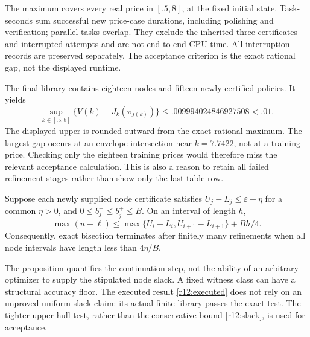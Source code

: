 \begin{table}[t]\centering\small
\caption{Constructive continuation to the uniform economic tolerance}\label{r12:frontier}

\par\smallskip\footnotesize The maximum covers every real price in $[.5,8]$, at the fixed initial state. Task-seconds sum successful new price-case durations, including polishing and verification; parallel tasks overlap. They exclude the inherited three certificates and interrupted attempts and are not end-to-end CPU time. All interruption records are preserved separately. The acceptance criterion is the exact rational gap, not the displayed runtime.
\end{table}

The final library contains eighteen nodes and fifteen newly certified policies. It yields
\begin{equation}
 \sup_{k\in[.5,8]}\{V(k)-J_k(\pi_{j(k)})\}
 \leq .009994024846927508 < .01.
 \label{r12:executed}
\end{equation}
The displayed upper is rounded outward from the exact rational maximum. The largest gap occurs at an envelope intersection near $k=7.7422$, not at a training price. Checking only the eighteen training prices would therefore miss the relevant acceptance calculation. This is also a reason to retain all failed refinement stages rather than show only the last table row.

\begin{proposition}\label{r12:termination}
Suppose each newly supplied node certificate satisfies $U_j-L_j\leq\varepsilon-\eta$ for a common $\eta>0$, and $0\leq b_j^-\leq b_j^+\leq\bar B$. On an interval of length $h$,
\begin{equation}
 \max(u-\ell)\leq\max\{U_i-L_i,U_{i+1}-L_{i+1}\}+\bar B h/4.
 \label{r12:slack}
\end{equation}
Consequently, exact bisection terminates after finitely many refinements when all node intervals have length less than $4\eta/\bar B$.
\end{proposition}
The proposition quantifies the continuation step, not the ability of an arbitrary optimizer to supply the stipulated node slack. A fixed witness class can have a structural accuracy floor. The executed result \eqref{r12:executed} does not rely on an unproved uniform-slack claim: its actual finite library passes the exact test. The tighter upper-hull test, rather than the conservative bound \eqref{r12:slack}, is used for acceptance.

